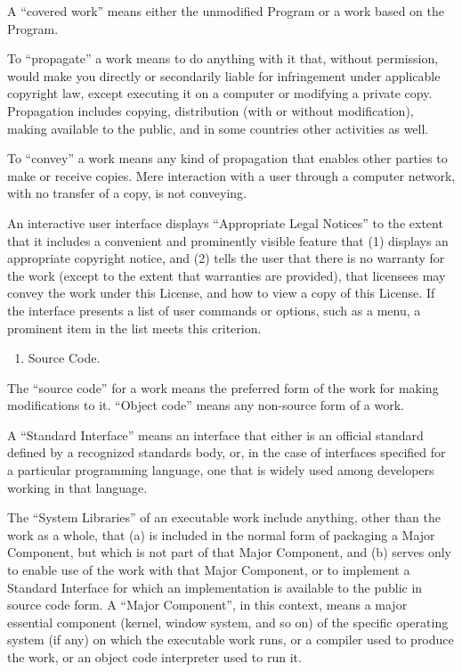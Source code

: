 \documentclass[11pt]{article}
\begin{document}
A “covered work” means either the unmodified Program or a work based on the Program.

To “propagate” a work means to do anything with it that, without permission, would make you directly or secondarily liable for infringement under applicable copyright law, except executing it on a computer or modifying a private copy. Propagation includes copying, distribution (with or without modification), making available to the public, and in some countries other activities as well.

To “convey” a work means any kind of propagation that enables other parties to make or receive copies. Mere interaction with a user through a computer network, with no transfer of a copy, is not conveying.

An interactive user interface displays “Appropriate Legal Notices” to the extent that it includes a convenient and prominently visible feature that (1) displays an appropriate copyright notice, and (2) tells the user that there is no warranty for the work (except to the extent that warranties are provided), that licensees may convey the work under this License, and how to view a copy of this License. If the interface presents a list of user commands or options, such as a menu, a prominent item in the list meets this criterion.

\begin{enumerate}
\item Source Code.
\end{enumerate}
The “source code” for a work means the preferred form of the work for making modifications to it. “Object code” means any non-source form of a work.

A “Standard Interface” means an interface that either is an official standard defined by a recognized standards body, or, in the case of interfaces specified for a particular programming language, one that is widely used among developers working in that language.

The “System Libraries” of an executable work include anything, other than the work as a whole, that (a) is included in the normal form of packaging a Major Component, but which is not part of that Major Component, and (b) serves only to enable use of the work with that Major Component, or to implement a Standard Interface for which an implementation is available to the public in source code form. A “Major Component”, in this context, means a major essential component (kernel, window system, and so on) of the specific operating system (if any) on which the executable work runs, or a compiler used to produce the work, or an object code interpreter used to run it.
\end{document}
